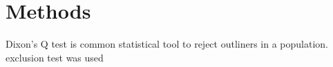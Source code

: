 \chapter{Methods}

Dixon's Q test is common statistical tool to reject outliners in a population.  exclusion test was used 